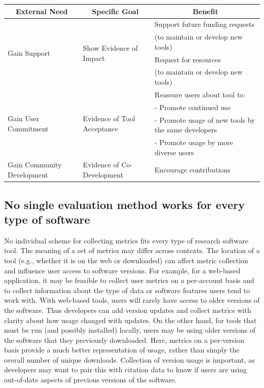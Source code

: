 \documentclass{article}
\begin{document}
\begin{table}[!ht]
\begin{tabular} {|p{}|p{}|p{}|}
    \hline
    \multicolumn{1}{|c|}{\cellcolor[gray]{.9} \textbf{External Need}} 
    & \multicolumn{1}{|c|}{\cellcolor[gray]{.9} \textbf{Specific Goal}}
    & \multicolumn{1}{|c|}{\cellcolor[gray]{.9} \textbf{Benefit}}\\[1.1ex] %
    \hline
    \multirow{4}{*}{Gain Support}              
    & \multirow{4}{*}{Show Evidence of Impact} & 
    Support future funding requests \\
    & &
    (to maintain or develop new tools) \\
    & &
    Request for resources  \\
    & & 
    (to maintain or develop new tools) \\[1.1ex]
    \hline
    \multirow{4}{*}{Gain User Commitment} 
    & \multirow{4}{*}{Evidence of Tool Acceptance} & 
    Reassure users about tool to:\\
    &&
    - Promote continued use\\
    && 
    - Promote usage of new tools by the same developers \\ 
    &&
    - Promote usage by more diverse users \\[1.1ex]
    \hline
    \multirow{1}{*}{Gain Community Development} 
    & \multirow{1}{*}{Evidence of Co-Development} & 
    Encourage contributions  \\
    \hline
  \end{tabular}
  \label{tab:benefit_table}
\end{table}

\subsection{No single evaluation method works for every type of software}
\label{sec:no_one_way}
No individual scheme for collecting metrics fits every type of research software tool.  The meaning of a set of metrics may differ across contexts. The location of a tool (e.g., whether it is on the web or downloaded) can affect metric collection and influence user access to software versions. For example, for a web-based application, it may be feasible to collect user metrics on a per-account basis and to collect information about the type of data or software features users tend to work with. With web-based tools, users will rarely have access to older versions of the software. Thus developers can add version updates and collect metrics with clarity about how usage changed with updates. On the other hand, for tools that must be run (and possibly installed) locally, users may be using older versions of the software that they previously downloaded. Here, metrics on a per-version basis provide a much better representation of usage, rather than simply the overall number of unique downloads. Collection of version usage is important, as developers may want to pair this with citation data to know if users are using out-of-date aspects of previous versions of the software.
\end{document}
